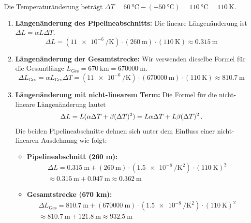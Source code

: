 \documentclass[ngerman]{scrreprt}
\newenvironment{loesungbox}[1]
  {\needspace{5\baselineskip}\begin{loesungboxstyle}[frametitle={#1}]}
  {\end{loesungboxstyle}}
\begin{document}
\begin{loesungbox}{Lösung zu \Cref{aufg:pipeline_ausdehnung}}
Die Temperaturänderung beträgt $\Delta T = \SI{60}{\celsius} - (\SI{-50}{\celsius}) = \SI{110}{\celsius} = \SI{110}{\kelvin}$. 
\begin{enumerate}
    \item \textbf{Längenänderung des Pipelineabschnitts:}
    Die lineare Längenänderung ist $\Delta L = \alpha L \Delta T$. 
    \begin{equation}
        \Delta L = (\SI{11e-6}{\per\kelvin}) \cdot (\SI{260}{\meter}) \cdot (\SI{110}{\kelvin}) \approx \SI{0.315}{\meter}
    \end{equation}
    
    \item \textbf{Längenänderung der Gesamtstrecke:}
    Wir verwenden dieselbe Formel für die Gesamtlänge $L_{\text{Ges}} = \SI{670}{\kilo\meter} = \SI{670000}{\meter}$.
    \begin{equation}
        \Delta L_{\text{Ges}} = \alpha L_{\text{Ges}} \Delta T = (\SI{11e-6}{\per\kelvin}) \cdot (\SI{670000}{\meter}) \cdot (\SI{110}{\kelvin}) \approx \SI{810.7}{\meter}
    \end{equation}
    
    \item \textbf{Längenänderung mit nicht-linearem Term:}
    Die Formel für die nicht-lineare Längenänderung lautet 
    $$\Delta L = L(\alpha\Delta T + \beta (\Delta T)^2) = L\alpha\Delta T + L\beta(\Delta T)^2 \,. $$ 
    Die beiden Pipelineabschnitte dehnen sich unter dem Einfluss einer nicht-linearen Ausdehnung wie folgt:
    \begin{itemize}
        \item \textbf{Pipelineabschnitt (260 m):}
        \begin{multline}
            \Delta L = \SI{0.315}{\meter} + (\SI{260}{\meter}) \cdot (\SI{1.5e-8}{\per\kelvin\squared}) \cdot (\SI{110}{\kelvin})^2 \\
            \approx \SI{0.315}{\meter} + \SI{0.047}{\meter} \approx \SI{0.362}{\meter}
        \end{multline}
        \item \textbf{Gesamtstrecke (670 km):}
        \begin{multline}
            \Delta L_{\text{Ges}} = \SI{810.7}{\meter} + (\SI{670000}{\meter}) \cdot (\SI{1.5e-8}{\per\kelvin\squared}) \cdot (\SI{110}{\kelvin})^2 \\
            \approx \SI{810.7}{\meter} + \SI{121.8}{\meter} \approx \SI{932.5}{\meter}
        \end{multline}
    \end{itemize}
\end{enumerate}
\end{loesungbox}
\end{document}
